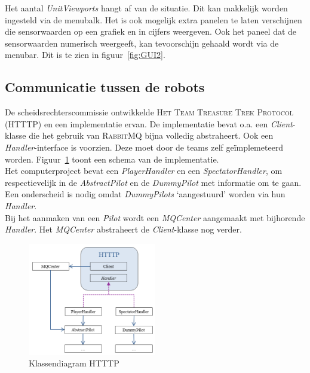 \documentclass[eind]{penoverslag}
\begin{document}
Het aantal \textit{UnitViewports} hangt af van de situatie. Dit kan makkelijk worden ingesteld via de menubalk. Het is ook mogelijk extra panelen te laten verschijnen die sensorwaarden op een grafiek en in cijfers weergeven. Ook het paneel dat de sensorwaarden numerisch weergeeft, kan tevoorschijn gehaald wordt via de menubar. Dit is te zien in figuur~\ref{fig:GUI2}.

\subsection{Communicatie tussen de robots}
\label{ssec:RabbMQ}
De scheidsrechterscommissie ontwikkelde \textsc{Het Team Treasure Trek Protocol (HTTTP)} en een implementatie ervan. De implementatie bevat o.a. een \textit{Client}-klasse die het gebruik van \textsc{RabbitMQ} bijna volledig abstraheert. Ook een \textit{Handler}-interface is voorzien. Deze moet door de teams zelf ge\"implemeteerd worden. Figuur~\ref{fig:klasHTTTP} toont een schema van de implementatie.\\

Het computerproject bevat een \textit{PlayerHandler} en een \textit{SpectatorHandler}, om respectievelijk in de \textit{AbstractPilot} en de \textit{DummyPilot} met informatie om te gaan. Een onderscheid is nodig omdat \textit{DummyPilots} `aangestuurd' worden via hun \textit{Handler}.\\

Bij het aanmaken van een \textit{Pilot} wordt een \textit{MQCenter} aangemaakt met bijhorende \textit{Handler}. Het \textit{MQCenter} abstraheert de \textit{Client}-klasse nog verder.

\begin{figure}[h]
\centering
	\includegraphics[width=0.5\textwidth]{KlasHTTTP}
\caption{Klassendiagram HTTTP}
\label{fig:klasHTTTP}
\end{figure}
\end{document}
